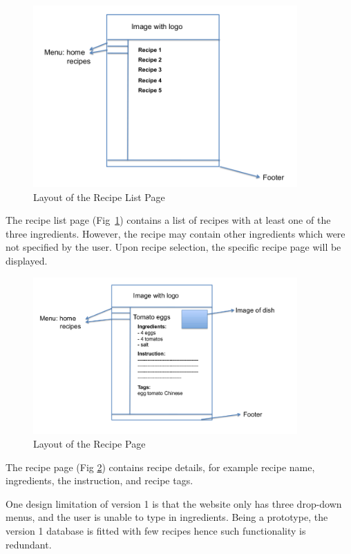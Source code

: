 \begin{figure}[H] %
\includegraphics[width=0.9\textwidth]{recipe_list_page}
\caption{Layout of the Recipe List Page}
\label{fig:recipe_list}
\end{figure}

The recipe list page (Fig~\ref{fig:recipe_list}) contains a list of recipes with at least one of the three ingredients. However, the recipe may contain other ingredients which were not specified by the user. Upon recipe selection, the specific recipe page will be displayed.

\begin{figure}[H]
\includegraphics[width=0.9\textwidth]{recipe_page}
\caption{Layout of the Recipe Page}
\label{fig:recipe_page}
\end{figure}

The recipe page (Fig \ref{fig:recipe_page}) contains recipe details, for example recipe name, ingredients, the instruction, and recipe tags.
 
One design limitation of version 1 is that the website only has three drop-down menus, and the user is unable to type in ingredients. Being a prototype, the version 1 database is fitted with few recipes hence such functionality is redundant. 

